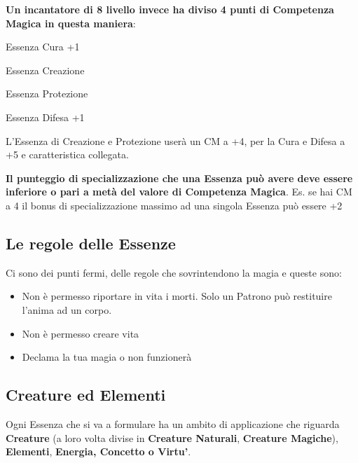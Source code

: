 \documentclass[a4paper,11pt,twoside,openany]{book}
\begin{document}
\bigskip

\textbf{Un incantatore di 8 livello invece ha diviso 4 punti di Competenza
	Magica in questa maniera}:

Essenza Cura +1

Essenza Creazione

Essenza Protezione

Essenza Difesa +1

L'Essenza di Creazione e Protezione userà un CM a +4, per la Cura e Difesa a +5 e caratteristica collegata.

\bigskip

\textbf{Il punteggio di specializzazione che una Essenza può avere deve essere inferiore o pari a metà del valore di Competenza Magica}. Es. se hai CM a 4 il bonus di specializzazione massimo ad una singola Essenza può essere +2

\subsection{Le regole delle Essenze}

\label{le-regole-delle-essenze}

Ci sono dei punti fermi, delle regole che sovrintendono la magia e queste sono:
\begin{itemize}
	\item Non è permesso riportare in vita i morti. Solo un Patrono può restituire l'anima ad un corpo.

	\item Non è permesso creare vita

	\item Declama la tua magia o non funzionerà

\end{itemize}

\subsection{Creature ed Elementi}

\label{creature-ed-elementi}

Ogni Essenza che si va a formulare ha un ambito di applicazione che riguarda \textbf{Creature} (a loro volta divise in \textbf{Creature Naturali}, \textbf{Creature Magiche}), \textbf{Elementi}, \textbf{Energia, Concetto o Virtu'}.
\bigskip
\end{document}

